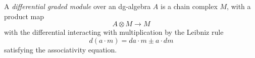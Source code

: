 
 
 
A \emph{differential graded module} over an dg-algebra $A$ is a chain complex $M$, with a product map
\[A\otimes M\to M\]
with the differential interacting with multiplication by the Leibniz rule
\[d(a\cdot m)= da\cdot m\pm a\cdot dm\]
satisfying the associativity equation. 

 